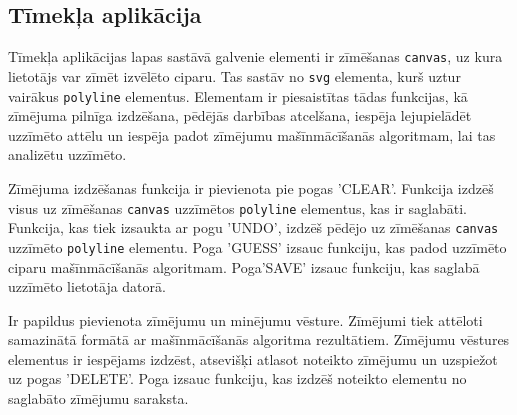 \subsection{Tīmekļa aplikācija}
Tīmekļa aplikācijas lapas sastāvā galvenie elementi ir zīmēšanas \texttt{canvas}, uz kura lietotājs var zīmēt izvēlēto ciparu. Tas sastāv no \texttt{svg} elementa, kurš uztur vairākus \texttt{polyline} elementus. Elementam ir piesaistītas tādas funkcijas, kā zīmējuma pilnīga izdzēšana, pēdējās darbības atcelšana, iespēja lejupielādēt uzzīmēto attēlu un iespēja padot zīmējumu mašīnmācīšanās algoritmam, lai tas analizētu uzzīmēto.\par Zīmējuma izdzēšanas funkcija ir pievienota pie pogas 'CLEAR'. Funkcija izdzēš visus uz zīmēšanas \texttt{canvas} uzzīmētos \texttt{polyline} elementus, kas ir saglabāti. Funkcija, kas tiek izsaukta ar pogu 'UNDO', izdzēš pēdējo uz zīmēšanas \texttt{canvas} uzzīmēto \texttt{polyline} elementu. Poga 'GUESS' izsauc funkciju, kas padod uzzīmēto ciparu mašīnmācīšanās algoritmam. Poga'SAVE' izsauc funkciju, kas saglabā uzzīmēto lietotāja datorā.
\par Ir papildus pievienota zīmējumu un minējumu vēsture. Zīmējumi tiek attēloti samazinātā formātā ar mašīnmācīšanās algoritma rezultātiem. Zīmējumu vēstures elementus ir iespējams izdzēst, atsevišķi atlasot noteikto zīmējumu un uzspiežot uz pogas 'DELETE'. Poga izsauc funkciju, kas izdzēš noteikto elementu no saglabāto zīmējumu saraksta.
